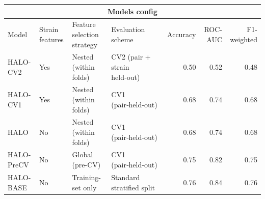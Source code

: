 \documentclass[10pt]{article}
\begin{document}
\begin{table}[t]
    \centering
    \scriptsize
    \setlength{\tabcolsep}{4pt}

    \begin{tabular}{@{} l l l p{3.2cm} r r r @{}}
        \toprule
        \multicolumn{7}{c}{\textbf{Models config}}                                                                          \\
        \midrule
        Model
                   & Strain features
                   & Feature selection strategy
                   & Evaluation scheme
                   & Accuracy
                   & ROC-AUC
                   & F1-weighted                                                                                            \\
        \midrule
        HALO-CV2   & Yes                        & Nested (within folds) & CV2 (pair + strain held‑out) & 0.50 & 0.52 & 0.48 \\
        HALO-CV1   & Yes                        & Nested (within folds) & CV1 (pair‑held‑out)          & 0.68 & 0.74 & 0.68 \\
        HALO       & No                         & Nested (within folds) & CV1 (pair‑held‑out)          & 0.68 & 0.74 & 0.68 \\
        HALO-PreCV & No                         & Global (pre-CV)       & CV1 (pair‑held‑out)          & 0.75 & 0.82 & 0.75 \\
        HALO-BASE  & No                         & Training-set only     & Standard stratified split    & 0.76 & 0.84 & 0.76 \\
        \bottomrule
    \end{tabular}
\end{table}
\end{document}
